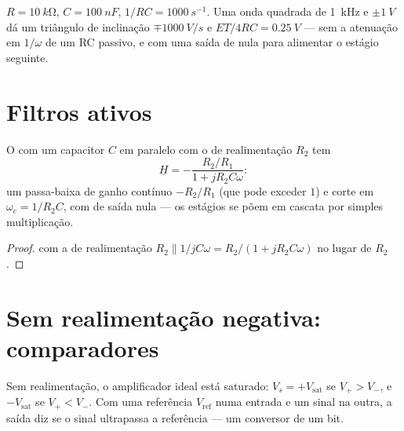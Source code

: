 \begin{example}\label{ex:b1:operational-amplifier:triangle}
$R = \qty{10}{k\ohm}$, $C = \qty{100}{nF}$, $1/RC = \qty{1000}{s^{-1}}$.
Uma onda quadrada de \qty{1}{kHz} e $\pm\qty{1}{V}$ dá um triângulo de inclinação
$\mp\qty{1000}{V/s}$ e  $ET/4RC = \qty{0.25}{V}$ --- sem
a atenuação em $1/\omega$ de um RC passivo, e com uma saída de 
nula para alimentar o estágio seguinte.
\end{example}

\section{Filtros ativos}

\begin{proposition}\label{prop:b1:operational-amplifier:activelp}
O  com um capacitor $C$ em paralelo com o  de
realimentação $R_2$ tem
\[
\underline H = -\frac{R_2/R_1}{1 + jR_2C\omega}:
\]
um passa-baixa de ganho contínuo $-R_2/R_1$ (que pode exceder $1$) e corte em
$\omega_c = 1/R_2C$, com  de saída nula --- os estágios se põem em cascata por
simples multiplicação.
\end{proposition}

\begin{proof}
 com a  de realimentação $R_2 \parallel 1/jC\omega
= R_2/(1 + jR_2C\omega)$ no lugar de $R_2$.
\end{proof}

\section{Sem realimentação negativa: comparadores}

\begin{proposition}[Comparador]\label{prop:b1:operational-amplifier:comparator}
Sem realimentação, o amplificador ideal está saturado:
$V_s = +V_{\mathrm{sat}}$ se $V_+ > V_-$, e $-V_{\mathrm{sat}}$ se
$V_+ < V_-$. Com uma referência $V_{\mathrm{ref}}$ numa entrada e um
sinal na outra, a saída diz se o sinal ultrapassa a
referência --- um conversor de um bit.
\end{proposition}

